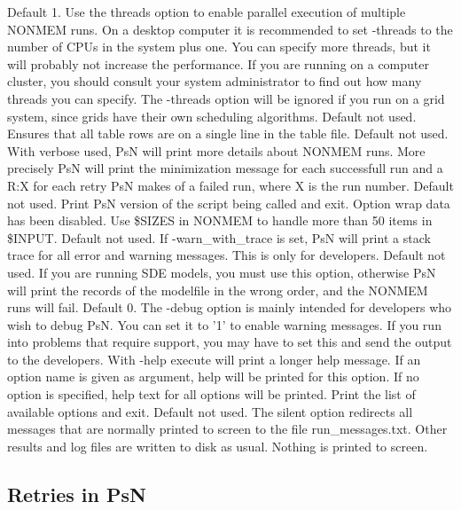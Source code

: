 \begin{optionlist}
\nextopt
{}
Default 1. Use the threads option to enable parallel execution of multiple NONMEM runs. On a desktop computer it is recommended to set -threads to the number of CPUs in the system plus one. You can specify more threads, but it will probably not increase the performance. If you are running on a computer cluster, you should consult your system administrator to find out how many threads you can specify. The -threads option will be ignored if you run on a grid system, since grids have their own scheduling algorithms. 
\nextopt
{}
Default not used. Ensures that all table rows are on a single line in the table file. 
\nextopt
{}
Default not used. With verbose used, PsN will print more details about NONMEM runs. More precisely PsN will print the minimization message for each successfull run and a R:X for each retry PsN makes of a failed run, where X is the run number. 
\nextopt
{}
Default not used. Print PsN version of the script being called and exit. 
\nextopt
{}
Option wrap data has been disabled. Use \$SIZES in NONMEM to handle more than 50 items in \$INPUT. 
\nextopt
{}
Default not used. If -warn\_with\_trace is set, PsN will print a stack trace for all error and warning messages. This is only for developers. 
\nextopt
{}
Default not used. If you are running SDE models, you must use this option, otherwise PsN will print the records of the modelfile in the wrong order, and the NONMEM runs will fail. 
\nextopt
{}
Default 0. The -debug option is mainly intended for developers who wish to debug PsN. You can set it to '1' to enable warning messages. If you run into problems that require support, you may have to set this and send the output to the developers. 
\nextopt
{}
With -help execute will print a longer help message. If an option name is given as argument, help will be printed for this option. If no option is specified, help text for all options will be printed. 
\nextopt
{}
Print the list of available options and exit. 
\nextopt
{}
Default not used. The silent option redirects all messages that are normally printed to screen to the file run\_messages.txt. Other results and log files are written to disk as usual. Nothing is printed to screen. 
\nextopt
\end{optionlist}


\subsection{Retries in PsN}

